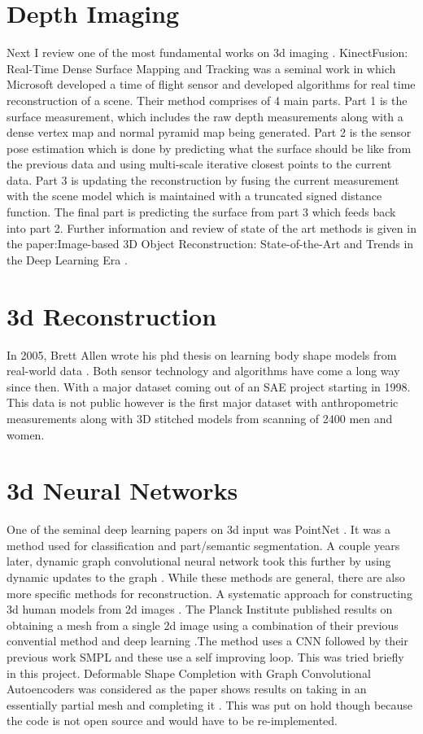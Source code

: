 \section{Depth Imaging}

Next I review one of the most fundamental works on 3d imaging \cite{izadi2011kinectfusion}. KinectFusion: Real-Time Dense Surface Mapping and Tracking was a seminal work in which Microsoft developed a time of flight sensor and developed algorithms for real time reconstruction of a scene. Their method comprises of 4 main parts. Part 1 is the surface measurement, which includes the raw depth measurements along with a dense vertex map and normal pyramid map being generated. Part 2 is the sensor pose estimation which is done by predicting what the surface should be like from the previous data and using multi-scale iterative closest points to the current data. Part 3 is updating the reconstruction by fusing the current measurement with the scene model which is maintained with a truncated signed distance function. The final part is predicting the surface from part 3 which feeds back into part 2.
Further information and review of state of the art methods is given in the paper:Image-based 3D Object Reconstruction: State-of-the-Art and Trends in the Deep Learning Era \cite{DBLP:journals/corr/abs-1906-06543}.

\section{3d Reconstruction}
In 2005, Brett Allen wrote his phd thesis on learning body shape models from real-world data \cite{allen2005learning}. Both sensor technology and algorithms have come a long way since then. With a major dataset coming out of an SAE project starting in 1998. This data is not public however is the first major dataset with anthropometric measurements along with 3D stitched models from scanning of 2400 men and women.

\section{3d Neural Networks}
One of the seminal deep learning papers on 3d input was PointNet \cite{DBLP:journals/corr/QiSMG16}. It was a method used for classification and part/semantic segmentation. A couple years later, dynamic graph convolutional neural network took this further by using dynamic updates to the graph \cite{DBLP:journals/corr/abs-1801-07829}. While these methods are general, there are also more specific methods for reconstruction. A systematic approach for constructing 3d human models from 2d images \cite{5645897}. The Planck Institute published results on obtaining a mesh from a single 2d image using a combination of their previous convential method and deep learning \cite{kolotouros2019learning}.The method uses a CNN followed by their previous work SMPL and these use a self improving loop. This was tried briefly in this project. Deformable Shape Completion with Graph Convolutional Autoencoders was considered as the paper shows results on taking in an essentially partial mesh and completing it \cite{litany2018deformable}. This was put on hold though because the code is not open source and would have to be re-implemented. 

